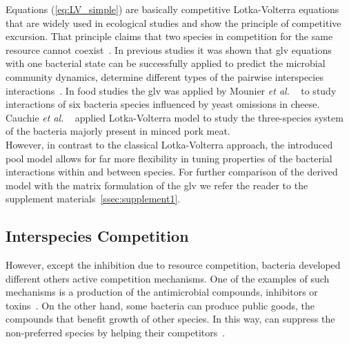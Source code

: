 \documentclass[10pt,A4paper]{article}
\numberwithin{equation}{section}
\newcommand{\etal}{{\textit{et al. }}}
\begin{document}
Equations (\ref{eq:LV_simple}) are basically competitive Lotka-Volterra equations that are widely used in ecological studies and show the principle of competitive excursion.
That principle claims that two species in competition for the same resource cannot coexist~\cite{wangersky_lotka-volterra_1978}.
In previous studies it was shown that \ac{glv} equations with one bacterial state can be successfully applied to predict the microbial community dynamics, determine different types of the pairwise interspecies interactions~\cite{dedrick_when_2023, stein_ecological_2013, venturelli_deciphering_2018, hoffmann_power_2007}.
In food studies the \ac{glv} was applied by Mounier \etal~\cite{mounier_microbial_2008} to study interactions of six bacteria species influenced by yeast omissions in cheese.
Cauchie \etal~\cite{cauchie_modeling_2020} applied Lotka-Volterra model to study the three-species system of the bacteria majorly present in minced pork meat.\\
%
However, in contrast to the classical Lotka-Volterra approach, the introduced pool model allows for far more flexibility in tuning properties of the bacterial interactions within and between species.
For further comparison of the derived model with the matrix formulation of the \ac{glv} we refer the reader to the supplement materials~\ref{ssec:supplement1}.
%
%
%
\subsection{Interspecies Competition}
However, except the inhibition due to resource competition, bacteria developed different others active competition mechanisms.
One of the examples of such mechanisms is a production of the antimicrobial compounds, inhibitors or toxins~\cite{wloch-salamon_effect_2008, chao_structured_1981}.
On the other hand, some bacteria can produce public goods, the compounds that benefit growth of other species.
In this way, can suppress the non-preferred species by helping their competitors~\cite{hibbing_bacterial_2010}.
%
%
\end{document}
